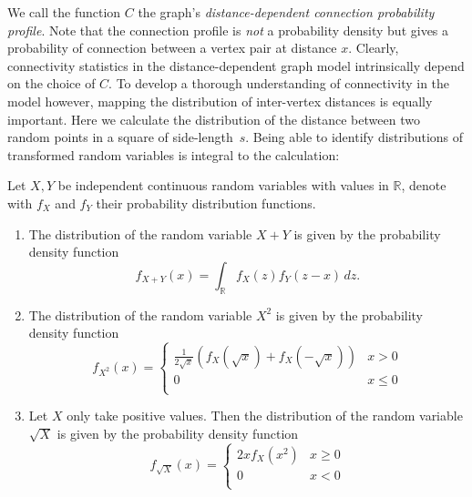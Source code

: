 We call the function $C$ the graph's \textit{distance-dependent
  connection probability profile}.
Note that the connection profile is \textit{not} a probability
density but gives a probability of connection between a vertex pair
at distance $x$. 
Clearly, connectivity statistics in the distance-dependent graph model
intrinsically depend on the choice of $C$. To develop a thorough
understanding of connectivity in the model however, mapping the
distribution of inter-vertex distances is equally important. Here we
calculate the distribution of the distance between two random points
in a square of side-length~$s$. Being able to identify distributions
of transformed random variables is integral to the calculation:

\begin{lemma} \label{lemma:transform_random_variable} 
  Let $X,Y$ be independent continuous random variables with values in
  $\mathbb{R}$, denote with $f_X$ and $f_Y$ their probability
  distribution functions.%
  \begin{enumerate}[label=(\arabic*),ref=(\arabic*), itemsep=-0.6cm]
    \item The distribution of the random variable $X+Y$ is given by
      the probability density function%
      \[%
        f_{X+Y}(x) = \int_{\mathbb{R}} f_X(z) f_Y(z-x)\, dz.  
      \]%
    \item The distribution of the random variable $X^2$ is given by
      the probability density function
      \[
        f_{X^2}(x) = %
        \begin{cases} 
          \frac{1}{2\sqrt{x}}\left(f_X(\sqrt{x})+f_X(-\sqrt{x})\right)
           & x > 0 \\           0     & x \leq 0 \\
        \end{cases}
      \]
    \item Let $X$ only take positive values. Then the distribution of
      the random variable $\sqrt{X}$ is given by the probability
      density function
      \[
        f_{\sqrt{X}}(x) = %
        \begin{cases}
          2x f_X(x^2) & x \geq 0 \\0   & x < 0 \\
        \end{cases}
      \]
  \end{enumerate}
\end{lemma}

